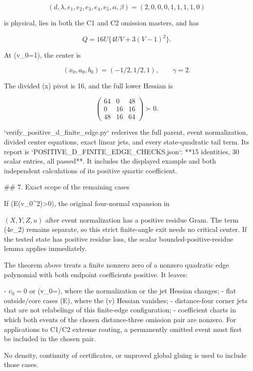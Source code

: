 \[
(d,\lambda,e_1,e_2,e_3,e_4,e_5,\alpha,\beta)
=(2,0,0,0,1,1,1,1,0)
\]

is physical, lies in both the C1 and C2 omission masters, and has

\[
Q=16U\{4UV+3(V-1)^2\}.
\]

At (v_0=1), the center is

\[
(x_0,a_0,b_0)=(-1/2,1/2,1),\qquad \gamma=2.
\]

The divided (x) pivot is 16, and the full lower Hessian is

\[
\begin{pmatrix}64&0&48\\0&16&16\\48&16&64\end{pmatrix}\succ0.
\]

`verify_positive_d_finite_edge.py` rederives the full parent, event
normalization, divided center equations, exact linear jets, and every
state-quadratic tail term. Its report is
`POSITIVE_D_FINITE_EDGE_CHECKS.json`: **15 identities, 30 scalar entries,
all passed**. It includes the displayed example and both independent
calculations of its positive quartic coefficient.

## 7. Exact scope of the remaining cases

If (E(v_0^2)>0), the original four-normal expansion in

\((X,Y,Z,u)\) after event normalization has a positive residue Gram.
The term (4e_2) remains separate, so this strict finite-angle exit needs
no critical center. If the tested state has positive residue loss, the
scalar bounded-positive-residue lemma applies immediately.

The theorem above treats a finite nonzero zero of a nonzero quadratic
edge polynomial with both endpoint coefficients positive. It leaves:

- \(v_0=0\) or (v_0=\infty), where the normalization or the jet Hessian
  changes;
- flat outside/core cases (E), where the (v) Hessian vanishes;
- distance-four corner jets that are not relabelings of this finite-edge
  configuration;
- coefficient charts in which both events of the chosen distance-three
  omission pair are nonzero. For applications to C1/C2 extreme routing,
  a permanently omitted event must first be included in the chosen pair.

No density, continuity of certificates, or unproved global gluing is used
to include those cases.

